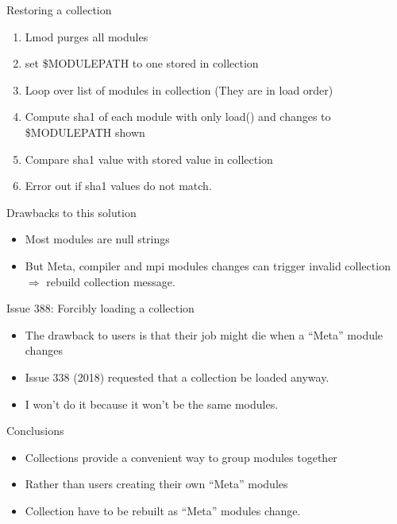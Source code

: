 \documentclass{beamer}
\begin{document}
\begin{frame}{Restoring a collection}
  \begin{enumerate}
    \item Lmod purges all modules
    \item set \$MODULEPATH to one stored in collection
    \item Loop over list of modules in collection (They are in
      load order)
    \item Compute sha1 of each module with only load() and changes to
      \$MODULEPATH shown
    \item Compare sha1 value with stored value in collection
    \item Error out if sha1 values do not match.
  \end{enumerate}
\end{frame}

\begin{frame}{Drawbacks to this solution}
  \begin{itemize}
    \item Most modules are null strings
    \item But Meta, compiler and mpi modules changes can trigger
      invalid collection $\Rightarrow$ rebuild collection message.
  \end{itemize}
\end{frame}

\begin{frame}{Issue 388: Forcibly loading a collection}
  \begin{itemize}
    \item The drawback to users is that their job might die when
      a ``Meta'' module changes
    \item Issue 338 (2018) requested that a collection be loaded anyway.
    \item I won't do it because it won't be the same modules.
  \end{itemize}
\end{frame}

\begin{frame}{Conclusions}
  \begin{itemize}
    \item Collections provide a convenient way to group modules together
    \item Rather than users creating their own ``Meta'' modules
    \item Collection have to be rebuilt as ``Meta'' modules change.
  \end{itemize}
\end{frame}
\end{document}
